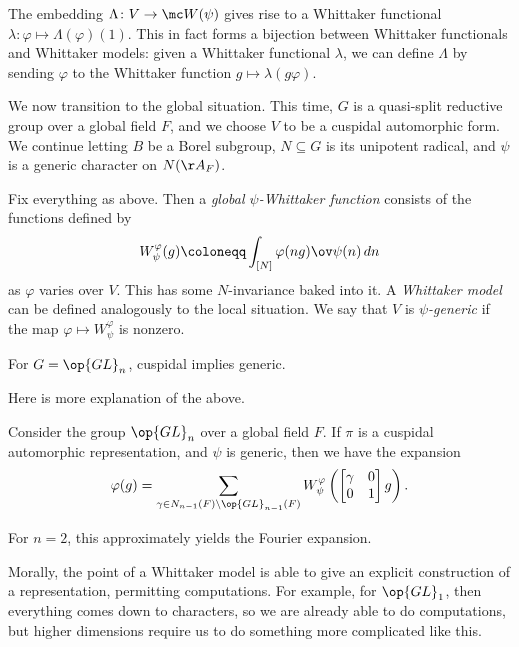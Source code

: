 \documentclass{article}
\begin{document}
\begin{remark}
	The embedding $\Lambda\colon V\to\mc W(\psi)$ gives rise to a Whittaker functional $\lambda\colon\varphi\mapsto\Lambda(\varphi)(1)$. This in fact forms a bijection between Whittaker functionals and Whittaker models: given a Whittaker functional $\lambda$, we can define $\Lambda$ by sending $\varphi$ to the Whittaker function $g\mapsto\lambda(g\varphi)$.
\end{remark}
We now transition to the global situation. This time, $G$ is a quasi-split reductive group over a global field $F$, and we choose $V$ to be a cuspidal automorphic form. We continue letting $B$ be a Borel subgroup, $N\subseteq G$ is its unipotent radical, and $\psi$ is a generic character on $N(\AA_F)$.
\begin{definition}
	Fix everything as above. Then a \textit{global $\psi$-Whittaker function} consists of the functions defined by
	\[W_\psi^\varphi(g)\coloneqq\int_{[N]}\varphi(ng)\ov\psi(n)\,dn\]
	as $\varphi$ varies over $V$. This has some $N$-invariance baked into it. A \textit{Whittaker model} can be defined analogously to the local situation. We say that $V$ is \textit{$\psi$-generic} if the map $\varphi\mapsto W_\psi^\varphi$ is nonzero.
\end{definition}
\begin{example}
	For $G=\op{GL}_n$, cuspidal implies generic.
\end{example}
Here is more explanation of the above.
\begin{theorem}
	Consider the group $\op{GL}_n$ over a global field $F$. If $\pi$ is a cuspidal automorphic representation, and $\psi$ is generic, then we have the expansion
	\[\varphi(g)=\sum_{\gamma\in N_{n-1}(F)\backslash\op{GL}_{n-1}(F)}W_\psi^\varphi\left(\begin{bmatrix}
		\gamma & 0 \\ 0 & 1
	\end{bmatrix}g\right).\]
\end{theorem}
\begin{example}
	For $n=2$, this approximately yields the Fourier expansion.
\end{example}
\begin{remark}
	Morally, the point of a Whittaker model is able to give an explicit construction of a representation, permitting computations. For example, for $\op{GL}_1$, then everything comes down to characters, so we are already able to do computations, but higher dimensions require us to do something more complicated like this.
\end{remark}
\end{document}
